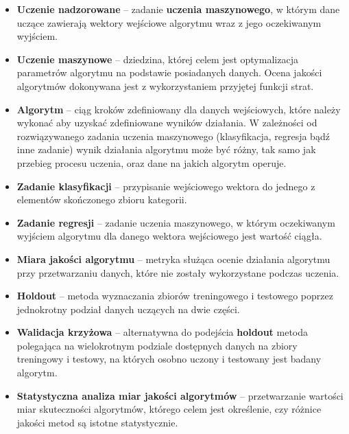 \documentclass[12pt]{article}
\begin{document}
\begin{itemize}
	\item 
	\textbf{Uczenie nadzorowane} -- zadanie \textbf{uczenia maszynowego}, w którym dane uczące zawierają wektory wejściowe algorytmu wraz z jego oczekiwanym wyjściem\cite{Bishop2006}. 
	
	\item 
	\textbf{Uczenie maszynowe} -- dziedzina, której celem jest optymalizacja parametrów algorytmu na podstawie posiadanych danych. Ocena jakości algorytmów dokonywana jest z wykorzystaniem przyjętej funkcji strat.
	\cite{Alpaydin2014}
	
	\item
	\textbf{Algorytm} -- ciąg kroków zdefiniowany dla danych wejściowych, które należy wykonać aby uzyskać zdefiniowane wyników działania. W zależności od rozwiązywanego zadania uczenia maszynowego (klasyfikacja, regresja bądź inne zadanie) wynik działania algorytmu może być różny, tak samo jak przebieg procesu uczenia, oraz dane na jakich algorytm operuje.
	
	\item 
	\textbf{Zadanie klasyfikacji} -- przypisanie wejściowego wektora do jednego z elementów skończonego zbioru kategorii\cite{Bishop2006}. 
	
	\item 
	\textbf{Zadanie regresji} -- zadanie uczenia maszynowego, w którym oczekiwanym wyjściem algorytmu dla danego wektora wejściowego jest wartość ciągła\cite{Bishop2006}.
	
	\item 
	\textbf{Miara jakości algorytmu} -- metryka służąca ocenie działania algorytmu przy przetwarzaniu danych, które nie zostały wykorzystane podczas uczenia.
	
	\item 
	\textbf{Holdout} -- metoda wyznaczania zbiorów treningowego i testowego poprzez jednokrotny podział danych uczących na dwie części.
	
	\item 
	\textbf{Walidacja krzyżowa} -- alternatywna do podejścia \textbf{holdout} metoda polegająca na wielokrotnym podziale dostępnych danych na zbiory treningowy i testowy, na których osobno uczony i testowany jest badany algorytm\cite{Alpaydin2014}.

	\item 
	\textbf{Statystyczna analiza miar jakości algorytmów} -- przetwarzanie wartości miar skuteczności algorytmów, którego celem jest określenie, czy różnice jakości metod są istotne statystycznie\cite{Dietterich1998}.
	
\end{itemize}
\end{document}
